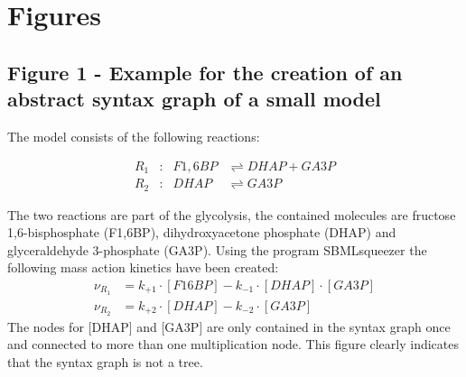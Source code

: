 \documentclass[10pt]{bmc_article}
\newenvironment{bmcformat}{\baselineskip20pt\sloppy\setboolean{publ}{false}}{\baselineskip20pt\sloppy}
\begin{document}
\begin{bmcformat}
\newpage
{
   }     %





\section*{Figures}

\subsection*{Figure 1 - Example for the creation of an abstract syntax graph of a small model}
The model consists of the following reactions:
\begin{center}
\parbox[c]{.35\textwidth}{\begin{align*}
R_{1}&:& F1,6BP &\rightleftharpoons DHAP + GA3P\\
R_{2}&:& DHAP   &\rightleftharpoons GA3P
\end{align*}}
\end{center}
The two reactions are part of the glycolysis, the contained molecules are fructose 1,6-bisphosphate (F1,6BP),
dihydroxyacetone phosphate (DHAP) and glyceraldehyde 3-phosphate (GA3P).
Using the program SBMLsqueezer \cite{Draeger2008} the following mass action kinetics have been created:
\begin{align*}
\nu_{R_{1}} &= k_{+1} \cdot [F16BP] - k_{-1} \cdot[DHAP] \cdot [GA3P]\\
\nu_{R_{2}} &= k_{+2} \cdot [DHAP]  - k_{-2} \cdot[GA3P]
\end{align*}
The nodes for [DHAP] and [GA3P] are only contained in the syntax graph once and connected to more than one multiplication node.
This figure clearly indicates that the syntax graph is not a tree.


\end{bmcformat}
\end{document}

